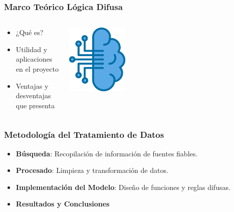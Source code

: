 \documentclass{beamer}
\newcommand{\slideauthor}[1]{\gdef\insertslideauthor{#1}}
\newcommand{\insertslideauthor}{}
\begin{document}
\begin{frame}
\frametitle{Marco Teórico Lógica Difusa}
\slideauthor{Diego Fogued}
\begin{columns}
    \begin{column}{0.7\textwidth}
        \begin{itemize}
            \item ¿Qué es?
            \vspace{0.5cm} 
            \item Utilidad y aplicaciones en el proyecto
            \vspace{0.5cm}
            \item Ventajas y desventajas que presenta
        \end{itemize}
    \end{column}
    \begin{column}{0.5\textwidth}
        \includegraphics[width=0.3\textwidth]{Images/fuzzy-logic.jpg}
    \end{column}
\end{columns}
\end{frame}

\begin{frame}
\frametitle{Metodología del Tratamiento de Datos}
\slideauthor{Diego Fogued}
\begin{itemize}
    \item \textbf{Búsqueda}: Recopilación de información de fuentes fiables.
    \vspace{0.35cm} 
    \item \textbf{Procesado}: Limpieza y transformación de datos.
    \vspace{0.35cm} 
    \item \textbf{Implementación del Modelo}: Diseño de funciones y reglas difusas.
    \vspace{0.35cm} 
    \item \textbf{Resultados y Conclusiones}
\end{itemize}
\end{frame}
\end{document}

